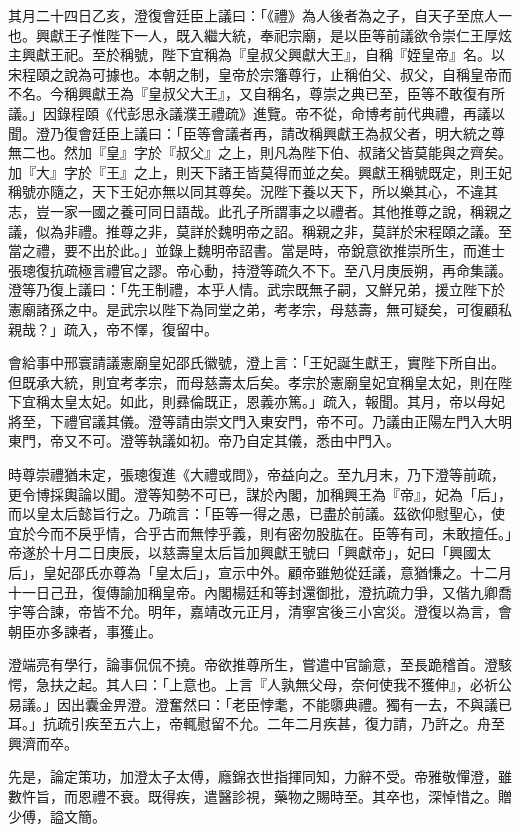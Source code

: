 \begin{pinyinscope}
其月二十四日乙亥，澄復會廷臣上議曰：「《禮》為人後者為之子，自天子至庶人一也。興獻王子惟陛下一人，既入繼大統，奉祀宗廟，是以臣等前議欲令崇仁王厚炫主興獻王祀。至於稱號，陛下宜稱為『皇叔父興獻大王』，自稱『姪皇帝』名。以宋程頤之說為可據也。本朝之制，皇帝於宗籓尊行，止稱伯父、叔父，自稱皇帝而不名。今稱興獻王為『皇叔父大王』，又自稱名，尊崇之典已至，臣等不敢復有所議。」因錄程頤《代彭思永議濮王禮疏》進覽。帝不從，命博考前代典禮，再議以聞。澄乃復會廷臣上議曰：「臣等會議者再，請改稱興獻王為叔父者，明大統之尊無二也。然加『皇』字於『叔父』之上，則凡為陛下伯、叔諸父皆莫能與之齊矣。加『大』字於『王』之上，則天下諸王皆莫得而並之矣。興獻王稱號既定，則王妃稱號亦隨之，天下王妃亦無以同其尊矣。況陛下養以天下，所以樂其心，不違其志，豈一家一國之養可同日語哉。此孔子所謂事之以禮者。其他推尊之說，稱親之議，似為非禮。推尊之非，莫詳於魏明帝之詔。稱親之非，莫詳於宋程頤之議。至當之禮，要不出於此。」並錄上魏明帝詔書。當是時，帝銳意欲推崇所生，而進士張璁復抗疏極言禮官之謬。帝心動，持澄等疏久不下。至八月庚辰朔，再命集議。澄等乃復上議曰：「先王制禮，本乎人情。武宗既無子嗣，又鮮兄弟，援立陛下於憲廟諸孫之中。是武宗以陛下為同堂之弟，考孝宗，母慈壽，無可疑矣，可復顧私親哉？」疏入，帝不懌，復留中。

會給事中邢寰請議憲廟皇妃邵氏徽號，澄上言：「王妃誕生獻王，實陛下所自出。但既承大統，則宜考孝宗，而母慈壽太后矣。孝宗於憲廟皇妃宜稱皇太妃，則在陛下宜稱太皇太妃。如此，則彞倫既正，恩義亦篤。」疏入，報聞。其月，帝以母妃將至，下禮官議其儀。澄等請由崇文門入東安門，帝不可。乃議由正陽左門入大明東門，帝又不可。澄等執議如初。帝乃自定其儀，悉由中門入。

時尊崇禮猶未定，張璁復進《大禮或問》，帝益向之。至九月末，乃下澄等前疏，更令博採輿論以聞。澄等知勢不可已，謀於內閣，加稱興王為『帝』，妃為「后」，而以皇太后懿旨行之。乃疏言：「臣等一得之愚，已盡於前議。茲欲仰慰聖心，使宜於今而不戾乎情，合乎古而無悖乎義，則有密勿股肱在。臣等有司，未敢擅任。」帝遂於十月二日庚辰，以慈壽皇太后旨加興獻王號曰「興獻帝」，妃曰「興國太后」，皇妃邵氏亦尊為「皇太后」，宣示中外。顧帝雖勉從廷議，意猶慊之。十二月十一日己丑，復傳諭加稱皇帝。內閣楊廷和等封還御批，澄抗疏力爭，又偕九卿喬宇等合諫，帝皆不允。明年，嘉靖改元正月，清寧宮後三小宮災。澄復以為言，會朝臣亦多諫者，事獲止。

澄端亮有學行，論事侃侃不撓。帝欲推尊所生，嘗遣中官諭意，至長跪稽首。澄駭愕，急扶之起。其人曰：「上意也。上言『人孰無父母，奈何使我不獲伸』，必祈公易議。」因出囊金畀澄。澄奮然曰：「老臣悖耄，不能隳典禮。獨有一去，不與議已耳。」抗疏引疾至五六上，帝輒慰留不允。二年二月疾甚，復力請，乃許之。舟至興濟而卒。

先是，論定策功，加澄太子太傅，廕錦衣世指揮同知，力辭不受。帝雅敬憚澄，雖數忤旨，而恩禮不衰。既得疾，遣醫診視，藥物之賜時至。其卒也，深悼惜之。贈少傅，謚文簡。


\end{pinyinscope}
